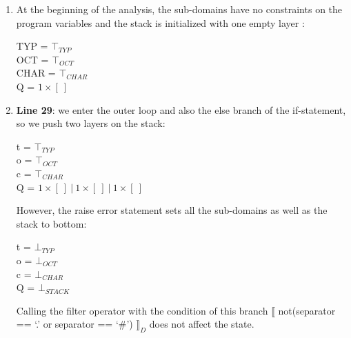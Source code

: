 \documentclass[10pt]{report}
\begin{document}
\begin{enumerate}
	\item At the beginning of the analysis, the sub-domains have no constraints on the program variables and the stack is initialized with one empty layer :
	\begin{center}
		TYP = $ \top_{TYP} $ \\
		OCT = $ \top_{OCT}$ \\
		CHAR = $ \top_{CHAR} $ \\
		Q = $ 1 \times [\ ] $
	\end{center}
	\item \textbf{Line 29}: we enter the outer loop and also the else 	  branch of the if-statement, so we push two layers on the stack: 
	\begin{center}
		t = $ \top_{TYP} $ \\
		o = $ \top_{OCT}$ \\
		c = $ \top_{CHAR} $ \\
		Q = $ 1 \times [\ ]\ \vert\ 1 \times [\ ]\ \vert\ 1 \times [\ ] $
	\end{center}
	
	However, the raise error statement sets all the sub-domains as well as the stack to bottom: 
	\begin{center}
		t = $ \bot_{TYP} $ \\
		o = $ \bot_{OCT}$ \\
		c = $ \bot_{CHAR} $ \\
		Q = $ \bot_{STACK} $
	\end{center}
	Calling the filter operator with the condition of this branch $ \llbracket $ not(separator == `.' or separator == `\#') $ \rrbracket_{D} $ does not affect the state. 
	

\end{enumerate}
\end{document}
